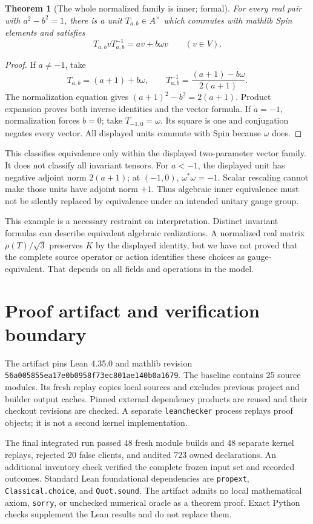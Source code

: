 \documentclass[11pt]{article}
\newtheorem{theorem}{Theorem}[section]
\begin{document}
\begin{theorem}[The whole normalized family is inner; formal]
For every real pair with $a^2-b^2=1$, there is a unit $T_{a,b}\in A^\times$ which commutes with mathlib Spin elements and satisfies
\[
 T_{a,b}vT_{a,b}^{-1}=av+b\omega v\qquad(v\in V).
\]
\end{theorem}
\begin{proof}
If $a\ne-1$, take
\[
 T_{a,b}=(a+1)+b\omega,\qquad
 T_{a,b}^{-1}=\frac{(a+1)-b\omega}{2(a+1)}.
\]
The normalization equation gives $(a+1)^2-b^2=2(a+1)$. Product expansion proves both inverse identities and the vector formula. If $a=-1$, normalization forces $b=0$; take $T_{-1,0}=\omega$. Its square is one and conjugation negates every vector. All displayed units commute with Spin because $\omega$ does.
\end{proof}

This classifies equivalence only within the displayed two-parameter vector family. It does not classify all invariant tensors. For $a<-1$, the displayed unit has negative adjoint norm $2(a+1)$; at $(-1,0)$, $\omega^*\omega=-1$. Scalar rescaling cannot make those units have adjoint norm $+1$. Thus algebraic inner equivalence must not be silently replaced by equivalence under an intended unitary gauge group.

This example is a necessary restraint on interpretation. Distinct invariant formulas can describe equivalent algebraic realizations. A normalized real matrix $\rho(T)/\sqrt3$ preserves $K$ by the displayed identity, but we have not proved that the complete source operator or action identifies these choices as gauge-equivalent. That depends on all fields and operations in the model.

\section{Proof artifact and verification boundary}
The artifact pins Lean 4.35.0 and mathlib revision
\texttt{56a005855ea17e0b0958f73ec801ae140b0a1679}. The baseline contains 25 source modules. Its fresh replay copies local sources and excludes previous project and builder output caches. Pinned external dependency products are reused and their checkout revisions are checked. A separate \texttt{leanchecker} process replays proof objects; it is not a second kernel implementation.

The final integrated run passed 48 fresh module builds and 48 separate kernel replays, rejected 20 false clients, and audited 723 owned declarations. An additional inventory check verified the complete frozen input set and recorded outcomes. Standard Lean foundational dependencies are \texttt{propext}, \texttt{Classical.choice}, and \texttt{Quot.sound}. The artifact admits no local mathematical axiom, \texttt{sorry}, or unchecked numerical oracle as a theorem proof. Exact Python checks supplement the Lean results and do not replace them.
\end{document}
